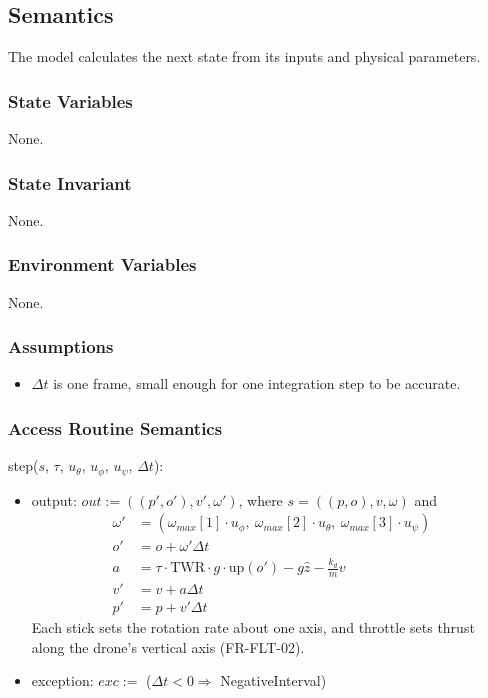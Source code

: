 \documentclass[12pt, titlepage]{article}
\begin{document}
\subsection{Semantics}

The model calculates the next state from its inputs and physical parameters.

\subsubsection{State Variables}

None.

\subsubsection{State Invariant}

None.

\subsubsection{Environment Variables}

None.

\subsubsection{Assumptions}

\begin{itemize}
\item $\Delta t$ is one frame, small enough for one integration step to be
  accurate.
\end{itemize}

\subsubsection{Access Routine Semantics}

\noindent step($s$, $\tau$, $u_\theta$, $u_\phi$, $u_\psi$, $\Delta t$):
\begin{itemize}
\item output: $out := ((p', o'), v', \omega')$, where $s = ((p, o), v,
  \omega)$ and
  \begin{align*}
  \omega' &= (\omega_{max}[1] \cdot u_\phi,\ \omega_{max}[2] \cdot
  u_\theta,\ \omega_{max}[3] \cdot u_\psi)\\
  o' &= o + \omega' \Delta t\\
  a &= \tau \cdot \text{TWR} \cdot g \cdot \text{up}(o') - g \hat{z} -
  \frac{k_d}{m} v\\
  v' &= v + a \Delta t\\
  p' &= p + v' \Delta t
  \end{align*}
  Each stick sets the rotation rate about one axis, and throttle sets thrust
  along the drone's vertical axis (FR-FLT-02).
\item exception: $exc :=$ ($\Delta t < 0 \Rightarrow$ NegativeInterval)
\end{itemize}
\end{document}

